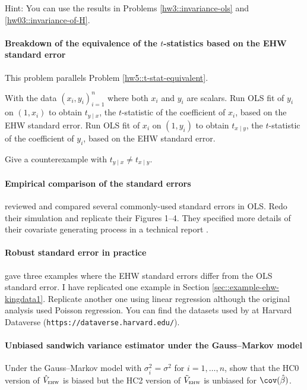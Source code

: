 Hint: You can use the results in Problems \ref{hw3::invariance-ols} and \ref{hw03::invariance-of-H}. 







\paragraph{Breakdown of the equivalence of the $t$-statistics based on the EHW standard error}\label{hw6::t-stat-equivalent-breakdown}


This problem parallels Problem \ref{hw5::t-stat-equivalent}. 


With the data $(x_i, y_i)_{i=1}^n$ where both $x_i$ and $y_i$ are scalars. Run OLS fit of $y_i$ on $(1,x_i)$ to obtain $t_{y\mid x}$, the $t$-statistic of the coefficient of $x_i$, based on the EHW standard error. Run OLS fit of $x_i$ on $(1,y_i)$ to obtain $t_{x\mid y}$, the $t$-statistic of the coefficient of $y_i$, based on the EHW standard error. 

Give a counterexample with $t_{y\mid x} \neq  t_{x\mid y}$.




 
 
\paragraph{Empirical comparison of the standard errors}
\citet{long2000using} reviewed and compared several commonly-used standard errors in OLS. Redo their simulation and replicate their Figures 1--4. They specified more details of their covariate generating process in a technical report \citep{long1998correcting}. 


\paragraph{Robust standard error in practice}
\citet{king2015robust} gave three examples where the EHW standard errors differ from the OLS standard error. I have replicated one example in Section \ref{sec::example-ehw-kingdata1}. Replicate another one using linear regression although the original analysis used Poisson regression. You can find the datasets used by \citet{king2015robust} at Harvard Dataverse (\texttt{https://dataverse.harvard.edu/}). 


\paragraph{Unbiased sandwich variance estimator under the Gauss--Markov model}\label{hw::ehw-unbiased-hc2}

Under the Gauss--Markov model with $\sigma_i^2 = \sigma^2$ for $i=1,\ldots, n$, show that the HC0 version of $\hat{V}_{\textsc{ehw}} $ is biased but the HC2 version of $\tilde{V}_{\textsc{ehw}} $ is unbiased  for $\cov(\hat{\beta})$. 





